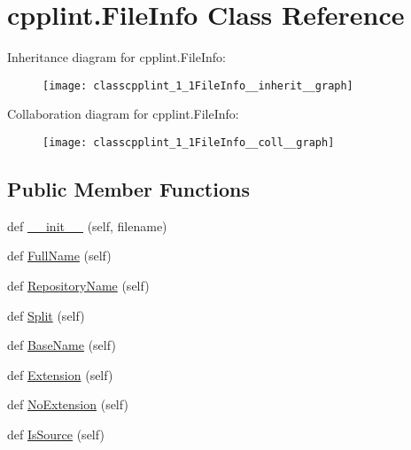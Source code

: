 \hypertarget{classcpplint_1_1FileInfo}{}\section{cpplint.\+File\+Info Class Reference}
\label{classcpplint_1_1FileInfo}


Inheritance diagram for cpplint.\+File\+Info\+:\nopagebreak
\begin{figure}[H]
\begin{center}
\leavevmode
\texttt{[image: classcpplint\_1\_1FileInfo\_\_inherit\_\_graph]}
\end{center}
\end{figure}


Collaboration diagram for cpplint.\+File\+Info\+:\nopagebreak
\begin{figure}[H]
\begin{center}
\leavevmode
\texttt{[image: classcpplint\_1\_1FileInfo\_\_coll\_\_graph]}
\end{center}
\end{figure}
\subsection*{Public Member Functions}
\begin{DoxyCompactItemize}
\item 
def \hyperlink{classcpplint_1_1FileInfo_abd3ff77aab027af2476b3a1d97b1f89c}{\+\_\+\+\_\+init\+\_\+\+\_\+} (self, filename)
\item 
def \hyperlink{classcpplint_1_1FileInfo_aed56577368c45cdf45fc4c9109129145}{Full\+Name} (self)
\item 
def \hyperlink{classcpplint_1_1FileInfo_a2b3b79b7d46221a6b9d0ea0bebac2061}{Repository\+Name} (self)
\item 
def \hyperlink{classcpplint_1_1FileInfo_a43f1c5ff1771da52e29c60c114955e72}{Split} (self)
\item 
def \hyperlink{classcpplint_1_1FileInfo_a1a12ed63ddc2ffd8f6a105e3ab4d6289}{Base\+Name} (self)
\item 
def \hyperlink{classcpplint_1_1FileInfo_a2554b504117839931e901b59a59c67ae}{Extension} (self)
\item 
def \hyperlink{classcpplint_1_1FileInfo_acb46555a72b346966f4bf28c08e3b1fa}{No\+Extension} (self)
\item 
def \hyperlink{classcpplint_1_1FileInfo_a157f8d3266d7291321db88cdad3b2879}{Is\+Source} (self)
\end{DoxyCompactItemize}


